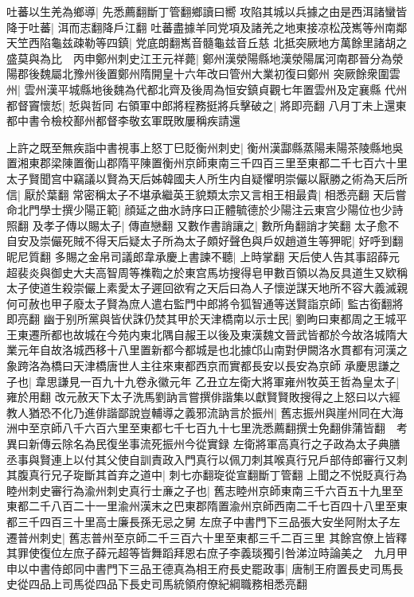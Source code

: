 吐蕃以生羌為鄉導|{
	先悉薦翻斷丁管翻鄉讀曰嚮}
攻陷其城以兵據之由是西洱諸蠻皆降于吐蕃|{
	洱而志翻降戶江翻}
吐蕃盡據羊同党項及諸羌之地東接凉松茂嶲等州南鄰天笁西陷龜兹疎勒等四鎮|{
	党底朗翻嶲音髓龜兹音丘慈}
北抵突厥地方萬餘里諸胡之盛莫與為比　丙申鄭州刺史江王元祥薨|{
	鄭州漢滎陽縣地漢滎陽属河南郡晉分為滎陽郡後魏屬北豫州後置鄭州隋開皇十六年改曰管州大業初復曰鄭州}
突厥餘衆圍雲州|{
	雲州漢平城縣地後魏為代都北齊及後周為恒安鎮貞觀七年置雲州及定襄縣}
代州都督竇懷悊|{
	悊與哲同}
右領軍中郎將程務挺將兵擊破之|{
	將即亮翻}
八月丁未上還東都中書令檢校鄯州都督李敬玄軍既敗屢稱疾請還

上許之既至無疾詣中書視事上怒丁巳貶衡州刺史|{
	衡州漢酃縣蒸陽耒陽茶陵縣地吳置湘東郡梁陳置衡山郡隋平陳置衡州京師東南三千四百三里至東都二千七百六十里}
太子賢聞宫中竊議以賢為天后姊韓國夫人所生内自疑懼明崇儼以厭勝之術為天后所信|{
	厭於葉翻}
常密稱太子不堪承繼英王貌類太宗又言相王相最貴|{
	相悉亮翻}
天后嘗命北門學士撰少陽正範|{
	顔延之曲水詩序曰正體毓德於少陽注云東宫少陽位也少詩照翻}
及孝子傳以賜太子|{
	傳直戀翻}
又數作書誚讓之|{
	數所角翻誚才笑翻}
太子愈不自安及崇儼死賊不得天后疑太子所為太子頗好聲色與戶奴趙道生等狎昵|{
	好呼到翻昵尼質翻}
多賜之金帛司議郎韋承慶上書諫不聽|{
	上時掌翻}
天后使人告其事詔薛元超裴炎與御史大夫高智周等襍鞫之於東宫馬坊搜得皂甲數百領以為反具道生又欵稱太子使道生殺崇儼上素愛太子遲回欲宥之天后曰為人子懷逆謀天地所不容大義滅親何可赦也甲子廢太子賢為庶人遣右監門中郎將令狐智通等送賢詣京師|{
	監古銜翻將即亮翻}
幽于别所黨與皆伏誅仍焚其甲於天津橋南以示士民|{
	劉昫曰東都周之王城平王東遷所都也故城在今苑内東北隅自赧王以後及東漢魏文晉武皆都於今故洛城隋大業元年自故洛城西移十八里置新都今都城是也北據邙山南對伊闕洛水貫都有河漢之象跨洛為橋曰天津橋唐世人主往來東都西京而實都長安以長安為京師}
承慶思謙之子也|{
	韋思謙見一百九十九卷永徽元年}
乙丑立左衛大將軍雍州牧英王哲為皇太子|{
	雍於用翻}
改元赦天下太子洗馬劉訥言嘗撰俳諧集以獻賢賢敗搜得之上怒曰以六經教人猶恐不化乃進俳諧鄙說豈輔導之義邪流訥言於振州|{
	舊志振州與崖州同在大海洲中至京師八千六百六里至東都七千七百九十七里洗悉薦翻撰士免翻俳蒲皆翻　考異曰新傳云除名為民復坐事流死振州今從實録}
左衛將軍高真行之子政為太子典膳丞事與賢連上以付其父使自訓責政入門真行以佩刀刺其喉真行兄戶部侍郎審行又刺其腹真行兄子琁斷其首弃之道中|{
	刺七亦翻琁從宣翻斷丁管翻}
上聞之不悦貶真行為睦州刺史審行為渝州刺史真行士亷之子也|{
	舊志睦州京師東南三千六百五十九里至東都二千八百二十一里渝州漢末之巴東郡隋置渝州京師西南二千七百四十八里至東都三千四百三十里高士廉長孫无忌之舅}
左庶子中書門下三品張大安坐阿附太子左遷普州刺史|{
	舊志普州至京師二千三百六十里至東都三千二百三里}
其餘宫僚上皆釋其罪使復位左庶子薛元超等皆舞蹈拜恩右庶子李義琰獨引咎涕泣時論美之　九月甲申以中書侍郎同中書門下三品王德真為相王府長史罷政事|{
	唐制王府置長史司馬長史從四品上司馬從四品下長史司馬統領府僚紀綱職務相悉亮翻}
